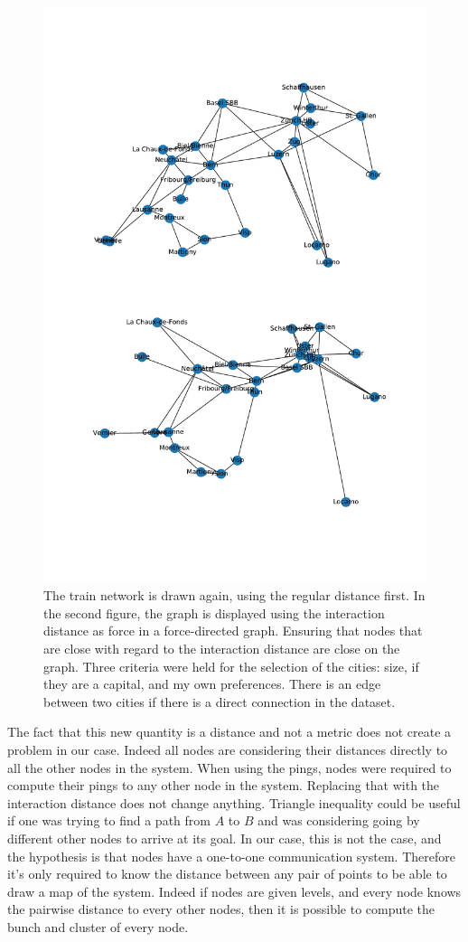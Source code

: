 \documentclass[a4paper,11pt,twoside=semi,openright]{report}
\begin{document}
\begin{figure}[!h] 
\centering
\includegraphics[width=350pt]{figures/CFF-NewDistances}
\caption{The train network is drawn again, using the regular distance first. In
 the second figure, the graph is displayed using the interaction distance as
 force in a force-directed graph. Ensuring that nodes that are close with
 regard to the interaction distance are close on the graph.  Three criteria were held for the selection of the cities: size, if they are a capital, and my own preferences. There is an edge between two cities if there is a direct connection in the dataset.}
 \label{fig:CFF-NewDistances}
\end{figure}

The fact that this new quantity is a distance and not a metric does not create
a problem in our case. Indeed all nodes are considering their distances directly
to all the other nodes in the system. When using the pings, nodes were required
to compute their pings to any other node in the system. Replacing that with the
interaction distance does not change anything. Triangle inequality could be
useful if one was trying to find a path from $A$ to $B$ and was considering
going by different other nodes to arrive at its goal. In our case, this is not
the case, and the hypothesis is that nodes have a one-to-one communication system.
Therefore it's only required to know the distance between any pair of points to be able to draw a map of the system. Indeed if nodes are given levels, and every node knows the pairwise distance to every other nodes, then it is possible to compute the bunch and cluster of every node.
\end{document}
